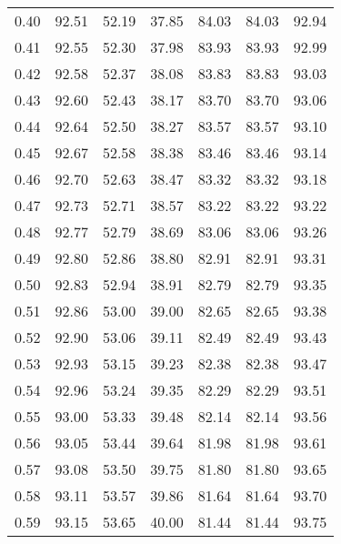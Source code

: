 \begin{tabular}{|c|c|c|c|c|c|c|}
      0.40 &     92.51 &     52.19 &      37.85 &   84.03 &      84.03 &         92.94 \\
      0.41 &     92.55 &     52.30 &      37.98 &   83.93 &      83.93 &         92.99 \\
      0.42 &     92.58 &     52.37 &      38.08 &   83.83 &      83.83 &         93.03 \\
      0.43 &     92.60 &     52.43 &      38.17 &   83.70 &      83.70 &         93.06 \\
      0.44 &     92.64 &     52.50 &      38.27 &   83.57 &      83.57 &         93.10 \\
      0.45 &     92.67 &     52.58 &      38.38 &   83.46 &      83.46 &         93.14 \\
      0.46 &     92.70 &     52.63 &      38.47 &   83.32 &      83.32 &         93.18 \\
      0.47 &     92.73 &     52.71 &      38.57 &   83.22 &      83.22 &         93.22 \\
      0.48 &     92.77 &     52.79 &      38.69 &   83.06 &      83.06 &         93.26 \\
      0.49 &     92.80 &     52.86 &      38.80 &   82.91 &      82.91 &         93.31 \\
      0.50 &     92.83 &     52.94 &      38.91 &   82.79 &      82.79 &         93.35 \\
      0.51 &     92.86 &     53.00 &      39.00 &   82.65 &      82.65 &         93.38 \\
      0.52 &     92.90 &     53.06 &      39.11 &   82.49 &      82.49 &         93.43 \\
      0.53 &     92.93 &     53.15 &      39.23 &   82.38 &      82.38 &         93.47 \\
      0.54 &     92.96 &     53.24 &      39.35 &   82.29 &      82.29 &         93.51 \\
      0.55 &     93.00 &     53.33 &      39.48 &   82.14 &      82.14 &         93.56 \\
      0.56 &     93.05 &     53.44 &      39.64 &   81.98 &      81.98 &         93.61 \\
      0.57 &     93.08 &     53.50 &      39.75 &   81.80 &      81.80 &         93.65 \\
      0.58 &     93.11 &     53.57 &      39.86 &   81.64 &      81.64 &         93.70 \\
      0.59 &     93.15 &     53.65 &      40.00 &   81.44 &      81.44 &         93.75 \\

\end{tabular}
